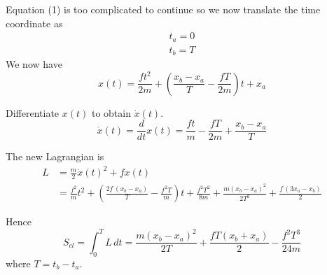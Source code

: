 \documentclass[12pt]{article}
\begin{document}
Equation (1) is too complicated to continue so we now translate the time coordinate as
\begin{align*}
t_a=0
\\
t_b=T
\end{align*}
We now have
\begin{equation*}
x(t)=\frac{ft^2}{2m}+\left(\frac{x_b-x_a}{T}-\frac{fT}{2m}\right)t+x_a
\tag{2}
\end{equation*}

Differentiate $x(t)$ to obtain $\dot x(t)$.
\begin{equation*}
\dot x(t)=
\frac{d}{dt}x(t)=\frac{ft}{m}-\frac{fT}{2m}+\frac{x_b-x_a}{T}
\tag{3}
\end{equation*}

The new Lagrangian is
\begin{align*}
L&=\frac{m}{2}\dot x(t)^2+fx(t)
\\[1ex]
&=\frac{f^2}{m}t^2
+\left(\frac{2f\,(x_b-x_a)}{T}-\frac{f^2T}{m}\right)t
+\frac{f^2T^2}{8m}
+\frac{m(x_b-x_a)^2}{2T^2}
+\frac{f\,(3x_a-x_b)}{2}
\tag{4}
\end{align*}

Hence
\begin{equation*}
S_{cl}=\int_0^T L\,dt
=\frac{m(x_b-x_a)^2}{2T}+\frac{fT(x_b+x_a)}{2}-\frac{f^2T^3}{24m}
\tag{5}
\end{equation*}
where $T=t_b-t_a$.
\end{document}
